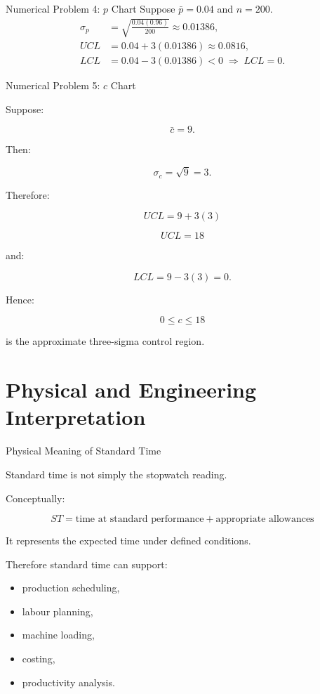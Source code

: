 \documentclass[aspectratio=169,10pt]{beamer}
\begin{document}

\begin{frame}{Numerical Problem 4: $p$ Chart}
\small
Suppose $\bar p=0.04$ and $n=200$.
\begin{align*}
\sigma_p&=\sqrt{\frac{0.04(0.96)}{200}}\approx0.01386,\\
UCL&=0.04+3(0.01386)\approx0.0816,\\
LCL&=0.04-3(0.01386)<0\;\Rightarrow\;LCL=0.
\end{align*}
\end{frame}


\begin{frame}[shrink=18]{Numerical Problem 5: $c$ Chart}
\small

Suppose:

\[
\bar c=9.
\]

Then:

\[
\sigma_c=\sqrt9=3.
\]

Therefore:

\[
UCL=9+3(3)
\]

\[
\boxed{
UCL=18
}
\]

and:

\[
LCL=9-3(3)=0.
\]

Hence:

\[
\boxed{
0\le c\le18
}
\]

is the approximate three-sigma control region.

\end{frame}


\section{Physical and Engineering Interpretation}

\begin{frame}[shrink=18]{Physical Meaning of Standard Time}
\small

Standard time is not simply the stopwatch reading.

Conceptually:

\[
\boxed{
ST=
\text{time at standard performance}
+
\text{appropriate allowances}
}
\]

It represents the expected time under defined conditions.

Therefore standard time can support:

\begin{itemize}
    \item production scheduling,
    \item labour planning,
    \item machine loading,
    \item costing,
    \item productivity analysis.
\end{itemize}

\end{frame}
\end{document}
